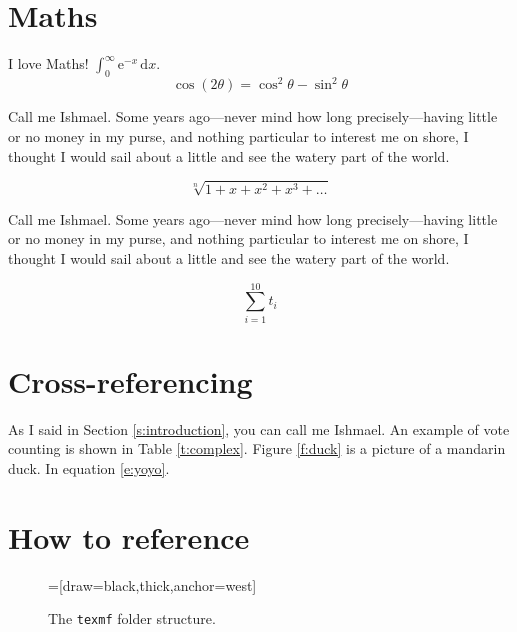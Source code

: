 \documentclass[12pt,a4paper]{article}
\begin{document}
\section{Maths}

I love Maths! $\int_0^\infty \mathrm{e}^{-x}\,\mathrm{d}
x$.
\begin{equation}
    \cos (2\theta) = \cos^2 \theta - \sin^2 \theta
\end{equation}

Call me Ishmael. Some years ago---never mind how long precisely---having little or no money in my purse, and nothing particular to interest me on shore, I thought I would sail about a little and see the watery part of the world.

\begin{equation}
    \sqrt[n]{1+x+x^2+x^3+\ldots}
\end{equation}

Call me Ishmael. Some years ago---never mind how long precisely---having little or no money in my purse, and nothing particular to interest me on shore, I thought I would sail about a little and see the watery part of the world.

\begin{equation}\label{e:yoyo}
    \sum_{i=1}^{10} t_i
\end{equation}

\section{Cross-referencing}
As I said in Section \ref{s:introduction}, you can call me Ishmael. An example of vote counting is shown in Table \ref{t:complex}. Figure \ref{f:duck} is a picture of a mandarin duck. In equation \ref{e:yoyo}.

\section{How to reference}

\begin{figure}
=[draw=black,thick,anchor=west]
\centering
{}
  \caption{The \texttt{texmf} folder structure.}
  \label{f:texmf}
\end{figure}
\end{document}
